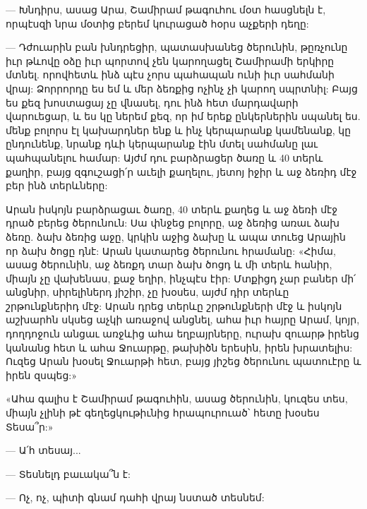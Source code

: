 \documentclass{article}
\begin{document}
{— Խնդիրս, ասաց Արա, Շամիրամ թագուհու մօտ հասցնելն է, որպէսզի նրա մօտից բերեմ կուրացած հօրս աչքերի դեղը:

— Դժուարին բան խնդրեցիր, պատասխանեց ծերունին, թըռչունը իւր թևովը օձը իւր պորտով չեն կարողացել Շամիրամի երկիրը մտնել. որովհետև ինձ պէս չորս պահապան ունի իւր սահմանի վրայ: Ձորրորդը ես եմ և մեր ձեռքից ոչինչ չի կարող սպրտնիլ: Բայց ես քեզ խոստացայ չը վնասել, դու ինձ հետ մարդավարի վարուեցար, և ես կը ներեմ քեզ, որ իմ երեք ընկերներին սպանել ես. մենք բոլորս էլ կախարդներ ենք և ինչ կերպարանք կամենանք, կը ընդունենք, նրանք դևի կերպարանք էին մտել սահմանը լաւ պահպանելու համար: Այժմ դու բարձրացեր ծառը և 40 տերև քաղիր, բայց զգուշացի՛ր աւելի քաղելու, յետոյ իջիր և աջ ձեռիդ մէջ բեր ինձ տերևները:

Արան իսկոյն բարձրացաւ ծառը, 40 տերև քաղեց և աջ ձեռի մէջ դրած բերեց ծերունուն: Սա փնջեց բոլորը, աջ ձեռից առաւ ձախ ձեռը. ձախ ձեռից աջը, կրկին աջից ձախը և ապա տուեց Արային որ ձախ ծոցը դնէ: Արան կատարեց ծերունու հրամանը: «Հիմա, ասաց ծերունին, աջ ձեռքդ տար ձախ ծոցդ և մի տերև հանիր, միայն չը վախենաս, քաջ եղիր, ինչպէս էիր: Մտքիցդ չար բաներ մի՛ անցնիր, սիրելիներդ յիշիր, չը խօսես, այժմ դիր տերևը շրթունքներիդ մէջ: Արան դրեց տերևը շրթունքների մէջ և իսկոյն աշխարհն սկսեց աչկի առաջով անցնել, ահա իւր հայրը Արամ, կոյր, դողդոջուն անցաւ առջևից ահա եղբայրները, ուրախ զուարթ իրենց կանանց հետ և ահա Ջուարթը, թախիծն երեսին, իրեն խրատելիս: Ուզեց Արան խօսել Ջուարթի հետ, բայց յիշեց ծերունու պատուէրը և իրեն զսպեց:»

«Ահա գալիս է Շամիրամ թագուհին, ասաց ծերունին, կուզես տես, միայն չլինի թէ գեղեցկութիւնից հրապուրուած՝ հետը խօսես Տեսա՞ր:»

— Ա՛հ տեսայ...

— Տեսնելդ բաւակա՞ն է:

— Ոչ, ոչ, պիտի գնամ դահի վրայ նստած տեսնեմ:

}
\end{document}
